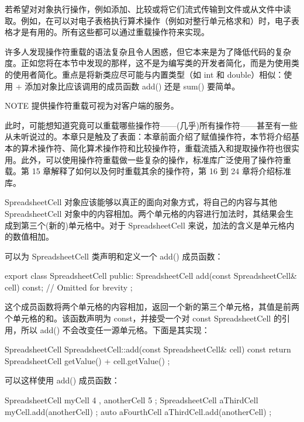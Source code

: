 
若希望对对象执行操作，例如添加、比较或将它们流式传输到文件或从文件中读取。例如，在可以对电子表格执行算术操作（例如对整行单元格求和）时，电子表格才是有用的。所有这些都可以通过重载操作符来实现。

许多人发现操作符重载的语法复杂且令人困惑，但它本来是为了降低代码的复杂度。正如您将在本节中发现的那样，这不是为编写类的开发者简化，而是为使用类的使用者简化。重点是将新类应尽可能与内置类型（如 int 和 double）相似：使用 + 添加对象比应该调用的成员函数 add() 还是 sum() 要简单。

\begin{myNotic}{NOTE}
提供操作符重载可视为对客户端的服务。
\end{myNotic}

此时，可能想知道究竟可以重载哪些操作符——(几乎)所有操作符——甚至有一些从未听说过的。本章只是触及了表面：本章前面介绍了赋值操作符，本节将介绍基本的算术操作符、简化算术操作符和比较操作符，重载流插入和提取操作符也很实用。此外，可以使用操作符重载做一些复杂的操作，标准库广泛使用了操作符重载。第 15 章解释了如何以及何时重载其余的操作符，第 16 到 24 章将介绍标准库。


SpreadsheetCell 对象应该能够以真正的面向对象方式，将自己的内容与其他 SpreadsheetCell 对象中的内容相加。两个单元格的内容进行加法时，其结果会生成到第三个(新的)单元格中。对于 SpreadsheetCell 来说，加法的含义是单元格内的数值相加。


可以为 SpreadsheetCell 类声明和定义一个 add() 成员函数：

\begin{cpp}
export class SpreadsheetCell
{
    public:
        SpreadsheetCell add(const SpreadsheetCell& cell) const;
        // Omitted for brevity
};
\end{cpp}

这个成员函数将两个单元格的内容相加，返回一个新的第三个单元格，其值是前两个单元格的和。该函数声明为 const，并接受一个对 const SpreadsheetCell 的引用，所以 add() 不会改变任一源单元格。下面是其实现：

\begin{cpp}
SpreadsheetCell SpreadsheetCell::add(const SpreadsheetCell& cell) const
{
    return SpreadsheetCell { getValue() + cell.getValue() };
}
\end{cpp}

可以这样使用 add() 成员函数：

\begin{cpp}
SpreadsheetCell myCell { 4 }, anotherCell { 5 };
SpreadsheetCell aThirdCell { myCell.add(anotherCell) };
auto aFourthCell { aThirdCell.add(anotherCell) };
\end{cpp}


